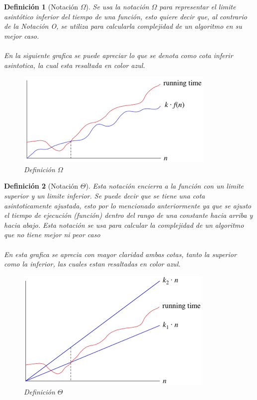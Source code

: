\documentclass[12pt,twoside]{article}
\newtheorem{defi}{Definición}
\begin{document}
\begin{defi}[Notaci\'on $\Omega$]
Se usa la notación $\Omega$ para representar el limite asintótico inferior del tiempo de una funci\'on, esto quiere decir que, al contrario de la Notaci\'on O, se utiliza para calcularla complejidad de un algoritmo en su mejor caso.
\\
\\
En la siguiente grafica se puede apreciar lo que se denota como cota inferir asintotica, la cual esta resaltada en color azul.
\begin{figure}[h!]
\centering
\includegraphics[scale=1.5]{big omega.png}
\caption{Definici\'on $\Omega$}
\label{fig:universe}
\end{figure}
\end{defi}

\begin{defi}[Notaci\'on $\Theta$]
Esta notaci\'on encierra a la funci\'on con un limite superior y un limite inferior. Se puede decir que se tiene una cota asintoticamente ajustada, esto por lo mencionado anteriormente ya que se ajusto el tiempo de ejecuci\'on (funci\'on) dentro del rango de una constante hacia arriba y hacia abajo. Esta notaci\'on se usa para calcular la complejidad de un algoritmo que no tiene mejor ni peor caso
\\
\\
En esta grafica se aprecia con mayor claridad ambas cotas, tanto la superior como la inferior, las cuales estan resaltadas en color azul. 
\begin{figure}[h!]
\centering
\includegraphics[scale=1.4]{big theta.png}
\caption{Definición $\Theta$}
\label{fig:universe}
\end{figure}
\end{defi}
\end{document}
